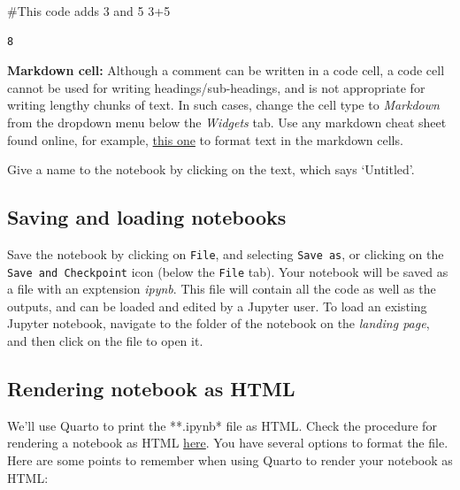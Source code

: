 \documentclass[
  letterpaper,
  DIV=11,
  numbers=noendperiod]{scrreprt}
\newenvironment{Shaded}{\begin{snugshade}}{\end{snugshade}}
\newcommand{\CommentTok}[1]{\textcolor[rgb]{0.37,0.37,0.37}{#1}}
\newcommand{\DecValTok}[1]{\textcolor[rgb]{0.68,0.00,0.00}{#1}}
\newcommand{\OperatorTok}[1]{\textcolor[rgb]{0.37,0.37,0.37}{#1}}
\begin{document}
\begin{Shaded}
\begin{Highlighting}[]
\CommentTok{\#This code adds 3 and 5}
\DecValTok{3}\OperatorTok{+}\DecValTok{5}
\end{Highlighting}
\end{Shaded}

\begin{verbatim}
8
\end{verbatim}

\textbf{Markdown cell:} Although a comment can be written in a code
cell, a code cell cannot be used for writing headings/sub-headings, and
is not appropriate for writing lengthy chunks of text. In such cases,
change the cell type to \emph{Markdown} from the dropdown menu below the
\emph{Widgets} tab. Use any markdown cheat sheet found online, for
example, \href{https://www.markdownguide.org/cheat-sheet/}{this one} to
format text in the markdown cells.

Give a name to the notebook by clicking on the text, which says
`Untitled'.

\hypertarget{saving-and-loading-notebooks}{%
\subsection{Saving and loading
notebooks}\label{saving-and-loading-notebooks}}

Save the notebook by clicking on \texttt{File}, and selecting
\texttt{Save\ as}, or clicking on the \texttt{Save\ and\ Checkpoint}
icon (below the \texttt{File} tab). Your notebook will be saved as a
file with an exptension \emph{ipynb}. This file will contain all the
code as well as the outputs, and can be loaded and edited by a Jupyter
user. To load an existing Jupyter notebook, navigate to the folder of
the notebook on the \emph{landing page}, and then click on the file to
open it.

\hypertarget{rendering-notebook-as-html}{%
\subsection{Rendering notebook as
HTML}\label{rendering-notebook-as-html}}

We'll use Quarto to print the **.ipynb* file as HTML. Check the
procedure for rendering a notebook as HTML
\href{https://quarto.org/docs/output-formats/html-basics.html}{here}.
You have several options to format the file. Here are some points to
remember when using Quarto to render your notebook as HTML:
\end{document}
